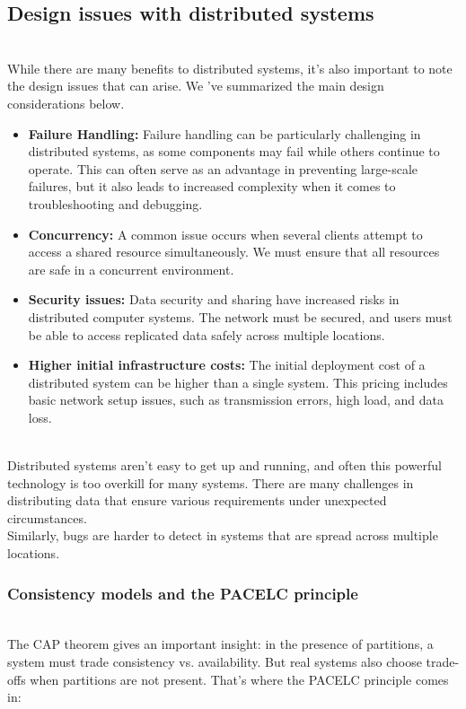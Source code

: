 \subsection{Design issues with distributed systems}\label{lg8KqVB9_nntDDQZJHAL6}
\\
While there are many benefits to distributed systems, it's also important to note the design issues that can arise. We 've summarized the main design considerations below.

\begin{itemize}
\item
\protect{}\label{oVXld_qPKDypsRy7f8Qyk}
\textbf{Failure Handling:} Failure handling can be particularly challenging in distributed systems, as some components may fail while others continue to operate. This can often serve as an advantage in preventing large-scale failures, but it also leads to increased complexity when it comes to troubleshooting and debugging.
\item
\protect{}\label{YlU0KkznKDpF2TzGwI0BZ}
\textbf{Concurrency:} A common issue occurs when several clients attempt to access a shared resource simultaneously. We must ensure that all resources are safe in a concurrent environment.
\item
\protect{}\label{Yj--rj-F7sX0aaCObghVi}
\textbf{Security issues:} Data security and sharing have increased risks in distributed computer systems. The network must be secured, and users must be able to access replicated data safely across multiple locations.
\item
\protect{}\label{V8QCNR30CvPt-m_xW_H4p}
\textbf{Higher initial infrastructure costs:} The initial deployment cost of a distributed system can be higher than a single system. This pricing includes basic network setup issues, such as transmission errors, high load, and data loss.
\end{itemize}
\\
Distributed systems aren't easy to get up and running, and often this powerful technology is too overkill for many systems. There are many challenges in distributing data that ensure various requirements under unexpected circumstances.
\\
Similarly, bugs are harder to detect in systems that are spread across multiple locations.

\subsubsection{Consistency models and the PACELC principle}\label{85BTgfsFEW2axp8_wPM5C}
\\
The CAP theorem gives an important insight: in the presence of partitions, a system must trade consistency vs. availability. But real systems also choose trade-offs when partitions are not present. That's where the PACELC principle comes in:

